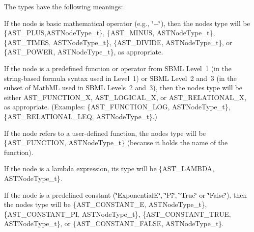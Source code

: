 The types have the following meanings\+:

\begin{DoxyItemize}
\item If the node is basic mathematical operator (e.\+g., {\ttfamily \char`\"{}+\char`\"{}}), then the node\textquotesingle{}s type will be \{A\+S\+T\+\_\+\+P\+L\+US,A\+S\+T\+Node\+Type\+\_\+t\}, \{A\+S\+T\+\_\+\+M\+I\+N\+US, A\+S\+T\+Node\+Type\+\_\+t\}, \{A\+S\+T\+\_\+\+T\+I\+M\+ES, A\+S\+T\+Node\+Type\+\_\+t\}, \{A\+S\+T\+\_\+\+D\+I\+V\+I\+DE, A\+S\+T\+Node\+Type\+\_\+t\}, or \{A\+S\+T\+\_\+\+P\+O\+W\+ER, A\+S\+T\+Node\+Type\+\_\+t\}, as appropriate.\end{DoxyItemize}
\begin{DoxyItemize}
\item If the node is a predefined function or operator from S\+B\+ML Level~1 (in the string-\/based formula syntax used in Level~1) or S\+B\+ML Level~2 and~3 (in the subset of Math\+ML used in S\+B\+ML Levels~2 and~3), then the node\textquotesingle{}s type will be either {\ttfamily A\+S\+T\+\_\+\+F\+U\+N\+C\+T\+I\+O\+N\+\_\+}X, {\ttfamily A\+S\+T\+\_\+\+L\+O\+G\+I\+C\+A\+L\+\_\+}X, or {\ttfamily A\+S\+T\+\_\+\+R\+E\+L\+A\+T\+I\+O\+N\+A\+L\+\_\+}X, as appropriate. (Examples\+: \{A\+S\+T\+\_\+\+F\+U\+N\+C\+T\+I\+O\+N\+\_\+\+L\+OG, A\+S\+T\+Node\+Type\+\_\+t\}, \{A\+S\+T\+\_\+\+R\+E\+L\+A\+T\+I\+O\+N\+A\+L\+\_\+\+L\+EQ, A\+S\+T\+Node\+Type\+\_\+t\}.)\end{DoxyItemize}
\begin{DoxyItemize}
\item If the node refers to a user-\/defined function, the node\textquotesingle{}s type will be \{A\+S\+T\+\_\+\+F\+U\+N\+C\+T\+I\+ON, A\+S\+T\+Node\+Type\+\_\+t\} (because it holds the name of the function).\end{DoxyItemize}
\begin{DoxyItemize}
\item If the node is a lambda expression, its type will be \{A\+S\+T\+\_\+\+L\+A\+M\+B\+DA, A\+S\+T\+Node\+Type\+\_\+t\}.\end{DoxyItemize}
\begin{DoxyItemize}
\item If the node is a predefined constant ({\ttfamily \char`\"{}\+Exponential\+E\char`\"{}}, {\ttfamily \char`\"{}\+Pi\char`\"{}}, {\ttfamily \char`\"{}\+True\char`\"{}} or {\ttfamily \char`\"{}\+False\char`\"{}}), then the node\textquotesingle{}s type will be \{A\+S\+T\+\_\+\+C\+O\+N\+S\+T\+A\+N\+T\+\_\+E, A\+S\+T\+Node\+Type\+\_\+t\}, \{A\+S\+T\+\_\+\+C\+O\+N\+S\+T\+A\+N\+T\+\_\+\+PI, A\+S\+T\+Node\+Type\+\_\+t\}, \{A\+S\+T\+\_\+\+C\+O\+N\+S\+T\+A\+N\+T\+\_\+\+T\+R\+UE, A\+S\+T\+Node\+Type\+\_\+t\}, or \{A\+S\+T\+\_\+\+C\+O\+N\+S\+T\+A\+N\+T\+\_\+\+F\+A\+L\+SE, A\+S\+T\+Node\+Type\+\_\+t\}.\end{DoxyItemize}
